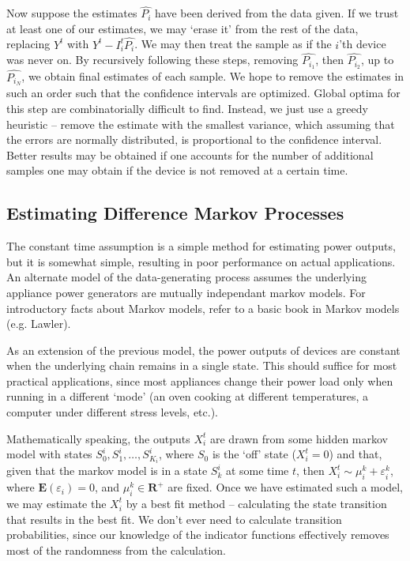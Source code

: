 \documentclass{article}
\begin{document}
Now suppose the estimates $\hat{P_i}$ have been derived from the data given. If we trust at least one of our estimates, we may `erase it' from the rest of the data, replacing $Y^t$ with $Y^t - I_i^t \hat{P_i}$. We may then treat the sample as if the $i$'th device was never on. By recursively following these steps, removing $\hat{P_{i_1}}$, then $\hat{P_{i_2}}$, up to $\hat{P_{i_N}}$, we obtain final estimates of each sample. We hope to remove the estimates in such an order such that the confidence intervals are optimized. Global optima for this step are combinatorially difficult to find. Instead, we just use a greedy heuristic -- remove the estimate with the smallest variance, which assuming that the errors are normally distributed, is proportional to the confidence interval. Better results may be obtained if one accounts for the number of additional samples one may obtain if the device is not removed at a certain time.

\subsection{Estimating Difference Markov Processes}

The constant time assumption is a simple method for estimating power outputs, but it is somewhat simple, resulting in poor performance on actual applications. An alternate model of the data-generating process assumes the underlying appliance power generators are mutually independant markov models. For introductory facts about Markov models, refer to a basic book in Markov models (e.g. Lawler).

As an extension of the previous model, the power outputs of devices are constant when the underlying chain remains in a single state. This should suffice for most practical applications, since most appliances change their power load only when running in a different `mode' (an oven cooking at different temperatures, a computer under different stress levels, etc.).

Mathematically speaking, the outputs $X_i^t$ are drawn from some hidden markov model with states $S^i_0, S^i_1, \dots, S^i_{K_i}$, where $S_0$ is the `off' state ($X_i^t = 0$) and that, given that the markov model is in a state $S^i_k$ at some time $t$, then $X_i^t \sim \mu_i^k + \varepsilon_i^k$, where $\mathbf{E}(\varepsilon_i) = 0$, and $\mu_i^k \in \mathbf{R}^+$ are fixed. Once we have estimated such a model, we may estimate the $X_i^t$ by a best fit method -- calculating the state transition that results in the best fit. We don't ever need to calculate transition probabilities, since our knowledge of the indicator functions effectively removes most of the randomness from the calculation.
\end{document}
